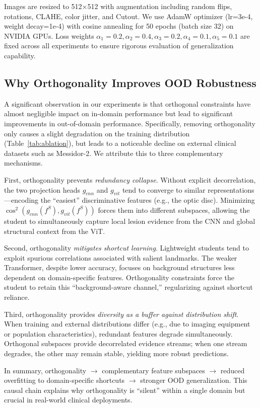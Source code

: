 \documentclass{article}
\begin{document}
Images are resized to 512$\times$512 with augmentation including random flips, rotations, CLAHE, color jitter, and Cutout. We use AdamW optimizer (lr=3e-4, weight decay=1e-4) with cosine annealing for 50 epochs (batch size 32) on NVIDIA GPUs. Loss weights $\alpha_1=0.2, \alpha_2=0.4, \alpha_3=0.2, \alpha_4=0.1, \alpha_5=0.1$ are fixed across all experiments to ensure rigorous evaluation of generalization capability.

\subsection{Why Orthogonality Improves OOD Robustness}
A significant observation in our experiments is that orthogonal constraints have almost negligible impact on in-domain performance but lead to significant improvements in out-of-domain performance. Specifically, removing orthogonality only causes a slight degradation on the training distribution (Table~\ref{tab:ablation}), but leads to a noticeable decline on external clinical datasets such as Messidor-2. We attribute this to three complementary mechanisms.

First, orthogonality prevents \textit{redundancy collapse}. Without explicit decorrelation, the two projection heads $g_{cnn}$ and $g_{vit}$ tend to converge to similar representations---encoding the ``easiest'' discriminative features (e.g., the optic disc). Minimizing $\cos^2(g_{cnn}(f^S), g_{vit}(f^S))$ forces them into different subspaces, allowing the student to simultaneously capture local lesion evidence from the CNN and global structural context from the ViT.

Second, orthogonality \textit{mitigates shortcut learning}. Lightweight students tend to exploit spurious correlations associated with salient landmarks. The weaker Transformer, despite lower accuracy, focuses on background structures less dependent on domain-specific features. Orthogonality constraints force the student to retain this ``background-aware channel,'' regularizing against shortcut reliance.

Third, orthogonality provides \textit{diversity as a buffer against distribution shift}. When training and external distributions differ (e.g., due to imaging equipment or population characteristics), redundant features degrade simultaneously. Orthogonal subspaces provide decorrelated evidence streams; when one stream degrades, the other may remain stable, yielding more robust predictions.

In summary, orthogonality $\to$ complementary feature subspaces $\to$ reduced overfitting to domain-specific shortcuts $\to$ stronger OOD generalization. This causal chain explains why orthogonality is ``silent'' within a single domain but crucial in real-world clinical deployments.
\end{document}
